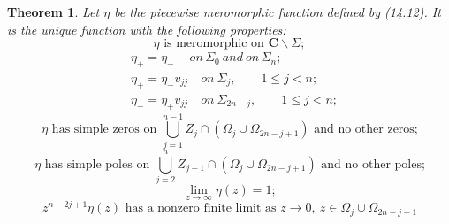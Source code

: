 \documentclass{surv-l}
\theoremstyle{plain}
\newtheorem{theorem}{Theorem}[section]
\theoremstyle{definition}
\numberwithin{equation}{chapter}
\begin{document}
\begin{theorem}\label{thm14.13}
Let $\eta$  be the piecewise meromorphic function defined by \emph{(14.12)}. It is the unique function with the following properties:
\setcounter{equation}{13}
\begin{equation}\label{eq14.14}
\eta\text{ is meromorphic on } \mathbf{C}\backslash \Sigma;
\end{equation}
\begin{align}\label{eq14.15}
&\eta_{+}=\eta_{-}\quad\ on\, \Sigma_{0}\ and \ on\, \Sigma_{n};\\\nonumber
&\eta_{+}=\eta_{-}v_{jj}\quad  on\ \Sigma_{j},\qquad 1\leq j<n; \\\nonumber
&\eta_{-}=\eta_{+}v_{jj}\quad on\ \Sigma_{2n-j},\qquad  1\leq j <n;
\end{align}
\begin{equation}\label{eq14.16}
\eta\text{ has simple zeros on } \bigcup_{j=1}^{n-1}Z_{j}\cap(\Omega_{j}\cup\Omega_{2n-j+1})\text{  and no other zeros;}
\end{equation}
\begin{equation}\label{eq14.17}
\eta \text{ has simple poles on }\bigcup_{j=2}^{n}Z_{j-1}\cap(\Omega_{j}\cup\Omega_{2n-j+1})\text{ and no  other poles;}
\end{equation}
\begin{equation}\label{eq14.18}
\lim_{z\rightarrow\infty}\eta(z)=1;
\end{equation}
\begin{equation}\label{eq14.19}
z^{n-2j+1}\eta(z)\text{ has a  nonzero finite limit as }z\rightarrow 0,\ z\in\Omega_{j}\cup\Omega_{2n-j+1}
\end{equation}
\end{theorem}
\end{document}
